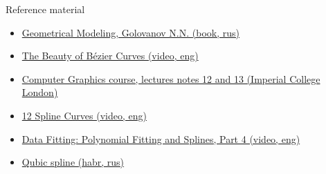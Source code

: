 \documentclass[aspectratio=169,notes]{beamer}
\newcommand{\fbckg}[1]{\usebackgroundtemplate{\texttt{[image: \#1]}}}%
\begin{document}
\begin{frame}[t]{Reference material}
    \Large
    \begin{itemize}
        \item \href{https://libgen.is/book/index.php?md5=D650EF9E78CBCD3367240A00B610C383}{Geometrical Modeling, Golovanov N.N. (book, rus)}
        \item \href{https://youtu.be/aVwxzDHniEw}{The Beauty of Bézier Curves (video, eng)}
        \item \href{http://wp.doc.ic.ac.uk/bkainz/teaching/60005-co317-computer-graphics/}{Computer Graphics course, lectures notes 12 and 13 (Imperial College London)}
        \item \href{https://www.youtube.com/watch?v=lk3uObcVnN0}{12 Spline Curves (video, eng)}
        \item \href{https://youtu.be/rtwOrZL02M0}{Data Fitting: Polynomial Fitting and Splines, Part 4 (video, eng)}
        \item \href{https://habr.com/ru/post/323442/}{Qubic spline (habr, rus)}
    \end{itemize}
\end{frame}

\fbckg{fibeamer/figs/last_page.png}
\frame[plain]{}
\end{document}
